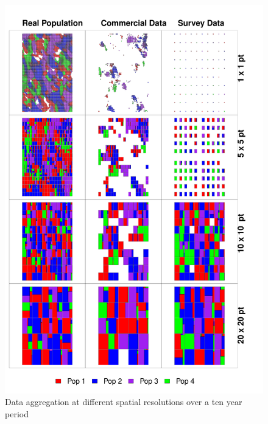 \documentclass[review]{elsarticle}
\begin{document}
\begin{figure}[!ht]
	\includegraphics[width=\linewidth]{../analysis/Data_Aggregation_space_Rev}
	\caption{Data aggregation at different spatial resolutions over a
		ten year period}
	\label{fig:1}
\end{figure}	
\end{document}
